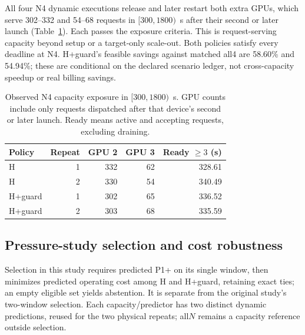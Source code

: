 All four N4 dynamic executions release and later restart both extra GPUs,
which serve 302--332 and 54--68 requests in $[300,1800)$~s after their
second or later launch (Table~\ref{tab:pressure-exposure}). Each passes the
exposure criteria. This is request-serving capacity beyond setup or a
target-only scale-out. Both policies satisfy every deadline at N4.
H+guard's feasible savings against matched all4 are 58.60\% and 54.94\%;
these are conditional on the declared scenario ledger, not cross-capacity
speedup or real billing savings.

\begin{table}[t]
\centering\small
\caption{Observed N4 capacity exposure in $[300,1800)$~s. GPU counts
include only requests dispatched after that device's second or later launch.
Ready means active and accepting requests, excluding draining.}
\label{tab:pressure-exposure}
\setlength{\tabcolsep}{4pt}
\begin{tabular*}{\linewidth}{@{\extracolsep{\fill}}lrrrr@{}}
\toprule
Policy & Repeat & GPU 2 & GPU 3 & Ready $\geq3$ (s)\\
\midrule
H & 1 & 332 & 62 & 328.61 \\
H & 2 & 330 & 54 & 340.49 \\
H+guard & 1 & 302 & 65 & 336.52 \\
H+guard & 2 & 303 & 68 & 335.59 \\
\bottomrule
\end{tabular*}
\end{table}

\subsection{Pressure-study selection and cost robustness}
Selection in this study requires predicted P1+ on its single window, then
minimizes predicted operating cost among H and H+guard, retaining exact
ties; an empty eligible set yields abstention. It is separate from the
original study's two-window selection. Each capacity/predictor has two
distinct dynamic predictions, reused for the two physical repeats;
all$N$ remains a capacity reference outside selection.

